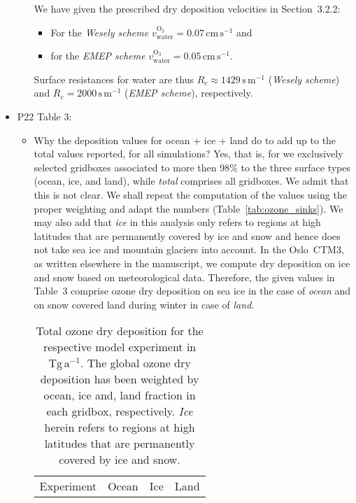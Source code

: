 \begin{itemize}
\begin{itemize}
    We have given the prescribed dry deposition velocities in Section~3.2.2:
    \begin{itemize}
      \item For the \emph{Wesely scheme}
        $v_\mathrm{water}^\mathrm{O_3} = 0.07\,\mathrm{cm\,s^{-1}}$ and
        \item for the \emph{EMEP scheme}
          $v_\mathrm{water}^\mathrm{O_3} = 0.05\,\mathrm{cm\,s^{-1}}$.
    \end{itemize}
    Surface resistances for water are thus $R_c \approx 1429\,\mathrm{s\,m^{-1}}$ (\emph{Wesely scheme}) and $R_c = 2000\,\mathrm{s\,m^{-1}}$ (\emph{EMEP scheme}), respectively.
  \end{itemize}

\item {\color{blue}  P22 Table 3:}
  \begin{itemize}
  \item {\color{blue}  Why the deposition values for ocean + ice + land do to add up to the total
    values reported, for all simulations?}
    Yes, that is, for we exclusively
    selected gridboxes associated to more then 98\% to the three surface types (ocean, ice, and land), while
    \emph{total} comprises all gridboxes. We admit that this is not clear.
    We shall repeat the computation of the values using the proper weighting and adapt the numbers (Table~\ref{tab:ozone_sinks}).
    We may also add that \emph{ice} in this analysis only
    refers to regions at high latitudes that are permanently covered by ice and snow and hence does not take
    sea ice and mountain glaciers into account. In the Oslo~CTM3, as written elsewhere in the manuscript, we
    compute dry deposition on ice and snow based on meteorological data. Therefore, the given values in Table~3
    comprise ozone dry deposition on sea ice in the case of \emph{ocean} and on snow covered land during winter
    in case of \emph{land}.
    \begin{table*}[t]
  \caption{Total ozone dry deposition for the respective model experiment in $\mathrm{Tg\,a^{-1}}$. The global ozone dry deposition has been weighted by ocean, ice and, land fraction in each gridbox, respectively. \emph{Ice} herein refers to regions at high latitudes that are permanently covered by ice and snow.}
  \begin{tabular}{lccccccccc}%
    \hline
    \multirow{3}{*}{Experiment} & \multicolumn{3}{c}{Ocean} & \multicolumn{3}{c}{Ice} & \multicolumn{3}{c}{Land}\\%

\end{tabular}
\end{table*}
\end{itemize}
\end{itemize}
